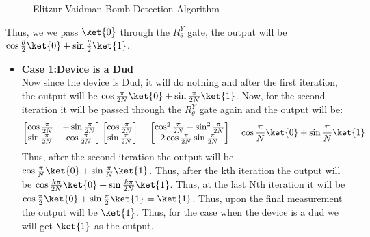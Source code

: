 \documentclass[12pt, oneside]{book}
\theoremstyle{definition}
\theoremstyle{definition}
\theoremstyle{remark}
\begin{document}
\begin{enumerate}
\begin{figure}[H]
        \caption{Elitzur-Vaidman Bomb Detection Algorithm}
        \label{elitzur}
    \end{figure}
    Thus, we we pass $\ket{0}$ through the $R^Y_{\theta}$ gate, the output will be $\cos\frac{\theta}{2}\ket{0}+\sin\frac{\theta}{2}\ket{1}$. 
    \begin{itemize}
        \item \textbf{Case 1:Device is a Dud}\\
        Now since the device is Dud, it will do nothing and after the first iteration, the output will be $\cos\frac{\pi}{2N}\ket{0}+\sin\frac{\pi}{2N}\ket{1}$.
        Now, for the second iteration it will be passed through the $R^Y_{\theta}$ gate again and the output will be:
        \[\begin{bmatrix}
            \cos\frac{\pi}{2N} & -\sin\frac{\pi}{2N} \\
            \sin\frac{\pi}{2N} & \cos\frac{\pi}{2N} \\
        \end{bmatrix}\begin{bmatrix}
            \cos\frac{\pi}{2N} \\
            \sin\frac{\pi}{2N} \\
        \end{bmatrix}=\begin{bmatrix}
            \cos^2\frac{\pi}{2N}-\sin^2\frac{\pi}{2N} \\
            2\cos\frac{\pi}{2N}\sin\frac{\pi}{2N} \\
        \end{bmatrix}=\cos\frac{\pi}{N}\ket{0}+\sin\frac{\pi}{N}\ket{1}\]
        Thus, after the second iteration the output will be $\cos\frac{\pi}{N}\ket{0}+\sin\frac{\pi}{N}\ket{1}$.
        Thus, after the kth iteration the output will be $\cos \frac{k\pi}{2N}\ket{0}+\sin \frac{k\pi}{2N}\ket{1}$.
        Thus, at the last Nth iteration it will be $\cos \frac{\pi}{2}\ket{0}+\sin \frac{\pi}{2}\ket{1}=\ket{1}$. Thus, upon the final measurement 
        the output will be $\ket{1}$. Thus, for the case when the device is a dud we will get $\ket{1}$ as the output.


\end{itemize}
\end{enumerate}
\end{document}
